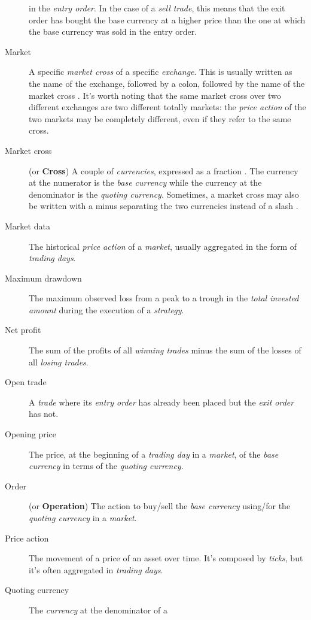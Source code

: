\begin{description}
		in the \textit{entry order}. In the case of a \textit{sell
		trade}, this means that the exit order has bought the base
		currency at a higher price than the one at which the base
		currency was sold in the entry order.
	\item[Market] A specific \textit{market cross} of a specific
		\textit{exchange}. This is usually written as the name of the
		exchange, followed by a colon, followed by the name of the
		market cross . It's worth
		noting that the same market cross over two different exchanges
		are two different totally markets: the \textit{price action} of
		the two markets may be completely different, even if they refer
		to the same cross.
	\item[Market cross] (or \textbf{Cross}) A couple of \textit{currencies},
		expressed as a fraction . The currency at the numerator is the
		\textit{base currency} while the currency at the denominator is
		the \textit{quoting currency}. Sometimes, a market cross may
		also be written with a minus separating the two currencies
		instead of a slash .
	\item[Market data] The historical \textit{price action} of a
		\textit{market}, usually aggregated in the form of
		\textit{trading days}.
	\item[Maximum drawdown] The maximum observed loss from a peak to a
		trough in the \textit{total invested amount} during the
		execution of a \textit{strategy}.
	\item[Net profit] The sum of the profits of all \textit{winning trades}
		minus the sum of the losses of all \textit{losing trades}.
	\item[Open trade] A \textit{trade} where its \textit{entry order} has
		already been placed but the \textit{exit order} has not.
	\item[Opening price] The price, at the beginning of a \textit{trading
		day} in a \textit{market}, of the \textit{base currency} in
		terms of the \textit{quoting currency}.
	\item[Order] (or \textbf{Operation}) The action to buy/sell the
		\textit{base currency} using/for the \textit{quoting currency}
		in a \textit{market}.
	\item[Price action] The movement of a price of an asset over time. It's
		composed by \textit{ticks}, but it's often aggregated in
		\textit{trading days}.
	\item[Quoting currency] The \textit{currency} at the denominator of a

\end{description}
